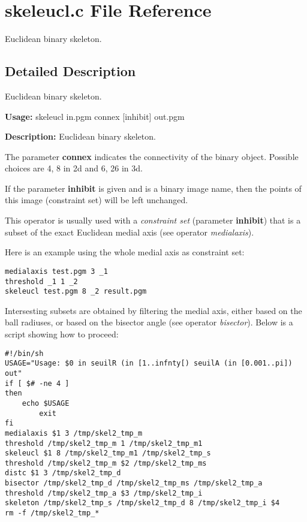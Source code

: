 \section{skeleucl.c File Reference}
\label{skeleucl_8c}
Euclidean binary skeleton.  




\label{_details}
\subsection{Detailed Description}
Euclidean binary skeleton. 

{\bf Usage:} skeleucl in.pgm connex [inhibit] out.pgm

{\bf Description:} Euclidean binary skeleton.

The parameter {\bf connex} indicates the connectivity of the binary object. Possible choices are 4, 8 in 2d and 6, 26 in 3d.

If the parameter {\bf inhibit} is given and is a binary image name, then the points of this image (constraint set) will be left unchanged.

This operator is usually used with a {\em constraint set\/} (parameter {\bf inhibit}) that is a subset of the exact Euclidean medial axis (see operator {\em medialaxis\/}).

Here is an example using the whole medial axis as constraint set:



\begin{footnotesize}\begin{verbatim}
medialaxis test.pgm 3 _1
threshold _1 1 _2
skeleucl test.pgm 8 _2 result.pgm
\end{verbatim}
\end{footnotesize}


Intersesting subsets are obtained by filtering the medial axis, either based on the ball radiuses, or based on the bisector angle (see operator {\em bisector\/}). Below is a script showing how to proceed:



\begin{footnotesize}\begin{verbatim}
#!/bin/sh
USAGE="Usage: $0 in seuilR (in [1..infnty[) seuilA (in [0.001..pi]) out"
if [ $# -ne 4 ]
then
	echo $USAGE
        exit
fi
medialaxis $1 3 /tmp/skel2_tmp_m
threshold /tmp/skel2_tmp_m 1 /tmp/skel2_tmp_m1
skeleucl $1 8 /tmp/skel2_tmp_m1 /tmp/skel2_tmp_s
threshold /tmp/skel2_tmp_m $2 /tmp/skel2_tmp_ms
distc $1 3 /tmp/skel2_tmp_d
bisector /tmp/skel2_tmp_d /tmp/skel2_tmp_ms /tmp/skel2_tmp_a
threshold /tmp/skel2_tmp_a $3 /tmp/skel2_tmp_i
skeleton /tmp/skel2_tmp_s /tmp/skel2_tmp_d 8 /tmp/skel2_tmp_i $4
rm -f /tmp/skel2_tmp_*
\end{verbatim}
\end{footnotesize}


